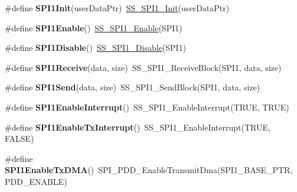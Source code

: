 \begin{DoxyCompactItemize}
\item 
\hypertarget{group___func_ala_gac8de7b80e5b0ecf000e1d03cdea302a8}{\#define {\bfseries S\-P\-I1\-Init}(user\-Data\-Ptr)~\hyperlink{group___s_s___s_p_i1__module_ga3fcbc65a28ef92bf7bb582ab1a44c492}{S\-S\-\_\-\-S\-P\-I1\-\_\-\-Init}(user\-Data\-Ptr)}\label{group___func_ala_gac8de7b80e5b0ecf000e1d03cdea302a8}

\item 
\hypertarget{group___func_ala_gaf4812e9ae032a8f1207e0893b75f4347}{\#define {\bfseries S\-P\-I1\-Enable}()~\hyperlink{group___s_s___s_p_i1__module_gaff0ae1b55915d6730a5670c42a4e2c95}{S\-S\-\_\-\-S\-P\-I1\-\_\-\-Enable}(S\-P\-I1)}\label{group___func_ala_gaf4812e9ae032a8f1207e0893b75f4347}

\item 
\hypertarget{group___func_ala_gaca561c6d4a12c2d6f8d5ce15c6a17a19}{\#define {\bfseries S\-P\-I1\-Disable}()~\hyperlink{group___s_s___s_p_i1__module_gaa1498d8d4293a6cb7230a4bc8b016a4f}{S\-S\-\_\-\-S\-P\-I1\-\_\-\-Disable}(S\-P\-I1)}\label{group___func_ala_gaca561c6d4a12c2d6f8d5ce15c6a17a19}

\item 
\hypertarget{group___func_ala_ga673b1184c819bb9a2df8576d05b91299}{\#define {\bfseries S\-P\-I1\-Receive}(data, size)~S\-S\-\_\-\-S\-P\-I1\-\_\-\-Receive\-Block(S\-P\-I1, data, size)}\label{group___func_ala_ga673b1184c819bb9a2df8576d05b91299}

\item 
\hypertarget{group___func_ala_ga943e184c743a5649d3edcf71d22e9c74}{\#define {\bfseries S\-P\-I1\-Send}(data, size)~S\-S\-\_\-\-S\-P\-I1\-\_\-\-Send\-Block(S\-P\-I1, data, size)}\label{group___func_ala_ga943e184c743a5649d3edcf71d22e9c74}

\item 
\hypertarget{group___func_ala_gaa5f647889b7710c7d6746d3847531523}{\#define {\bfseries S\-P\-I1\-Enable\-Interrupt}()~S\-S\-\_\-\-S\-P\-I1\-\_\-\-Enable\-Interrupt(T\-R\-U\-E, T\-R\-U\-E)}\label{group___func_ala_gaa5f647889b7710c7d6746d3847531523}

\item 
\hypertarget{group___func_ala_ga46d7206d177c845ab2530e6d013cda34}{\#define {\bfseries S\-P\-I1\-Enable\-Tx\-Interrupt}()~S\-S\-\_\-\-S\-P\-I1\-\_\-\-Enable\-Interrupt(T\-R\-U\-E, F\-A\-L\-S\-E)}\label{group___func_ala_ga46d7206d177c845ab2530e6d013cda34}

\item 
\hypertarget{group___func_ala_ga413d6ce8194e0e638cd154f07beacb32}{\#define {\bfseries S\-P\-I1\-Enable\-Tx\-D\-M\-A}()~S\-P\-I\-\_\-\-P\-D\-D\-\_\-\-Enable\-Transmit\-Dma(S\-P\-I1\-\_\-\-B\-A\-S\-E\-\_\-\-P\-T\-R, P\-D\-D\-\_\-\-E\-N\-A\-B\-L\-E)}\label{group___func_ala_ga413d6ce8194e0e638cd154f07beacb32}


\end{DoxyCompactItemize}

